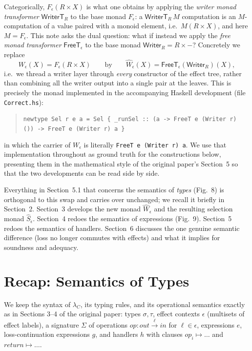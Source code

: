 \documentclass[11pt]{article}
\theoremstyle{plain}
\newcommand{\eps}{\epsilon}
\newcommand{\op}{\mathit{op}}
\begin{document}
Categorically, $F_\eps(R\times X)$ is what one obtains by applying the \emph{writer monad
transformer} $\mathsf{WriterT}_R$ to the base monad $F_\eps$: a $\mathsf{WriterT}_R\, M$
computation is an $M$-computation of a value paired with a monoid element, i.e.\ $M(R\times
X)$, and here $M = F_\eps$. This note asks the dual question: what if instead we apply the
\emph{free monad transformer} $\mathsf{FreeT}_\eps$ to the base monad
$\mathsf{Writer}_R = R\times -$? Concretely we replace
\[
  W_\eps(X) = F_\eps(R \times X)
  \qquad\text{by}\qquad
  \widehat W_\eps(X) = \mathsf{FreeT}_\eps(\mathsf{Writer}_R)(X),
\]
i.e.\ we thread a writer layer through \emph{every} constructor of the effect tree, rather
than combining all the writer output into a single pair at the leaves. This is precisely the
monad implemented in the accompanying Haskell development (file \texttt{Correct.hs}):
\begin{quote}
\texttt{newtype Sel r e a = Sel \{ \_runSel :: (a -> FreeT e (Writer r) ()) -> FreeT e (Writer r) a \}}
\end{quote}
in which the carrier of $W_\eps$ is literally \texttt{FreeT e (Writer r) a}. We use that
implementation throughout as ground truth for the constructions below, presenting them in
the mathematical style of the original paper's Section~5 so that the two developments can be
read side by side.

Everything in Section~5.1 that concerns the semantics of \emph{types} (Fig.~8) is orthogonal
to this swap and carries over unchanged; we recall it briefly in Section~2. Section~3
develops the new monad $\widehat W_\eps$ and the resulting selection monad $\widehat S_\eps$.
Section~4 redoes the semantics of expressions (Fig.~9). Section~5 redoes the semantics of
handlers. Section~6 discusses the one genuine semantic difference (loss no longer commutes
with effects) and what it implies for soundness and adequacy.

\section{Recap: Semantics of Types}

We keep the syntax of $\lambda_C$, its typing rules, and its operational semantics exactly as
in Sections 3--4 of the original paper: types $\sigma,\tau$, effect contexts $\eps$ (multisets
of effect labels), a signature $\Sigma$ of operations $\op : \mathit{out}\xrightarrow{\ell}
\mathit{in}$ for $\ell\in\eps$, expressions $e$, loss-continuation expressions $g$, and
handlers $h$ with clauses $\op_i\mapsto\dots$ and $\mathit{return}\mapsto\dots$.
\end{document}
